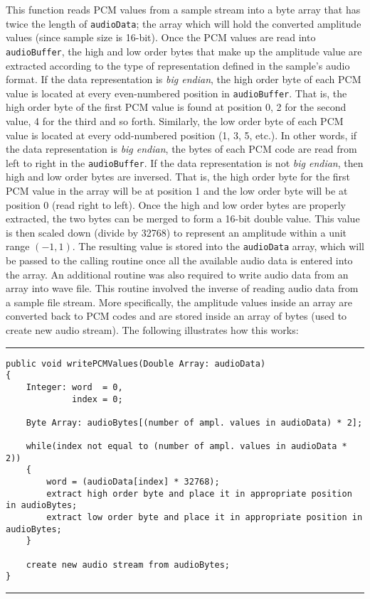 This function reads PCM values from a sample stream into a byte array that has
twice the length of \verb+audioData+; the array which will hold the converted amplitude
values (since sample size is 16-bit). Once the PCM values are read into \verb+audioBuffer+,
the high and low order bytes that make up the amplitude value are extracted
according to the type of representation defined in the sample's audio format.
If the data representation is {\it big endian}, the high order byte of each PCM value is
located at every even-numbered position in \verb+audioBuffer+. That is, the high order
byte of the first PCM value is found at position 0, 2 for the second value, 4 for
the third and so forth. Similarly, the low order byte of each PCM value is located
at every odd-numbered position (1, 3, 5, etc.). In other words, if the data
representation is {\it big endian}, the bytes of each PCM code are read from left to
right in the \verb+audioBuffer+. If the data representation is not {\it big endian}, then high
and low order bytes are inversed. That is, the high order byte for the first PCM
value in the array will be at position 1 and the low order byte will be at
position 0 (read right to left). Once the high and low order bytes are properly
extracted, the two bytes can be merged to form a 16-bit double value. This value is
then scaled down (divide by 32768) to represent an amplitude within a unit range $(-1, 1)$.
The resulting value is stored into the \verb+audioData+ array, which will be passed to
the calling routine once all the available audio data is entered into the array. An
additional routine was also required to write audio data from an array into wave
file. This routine involved the inverse of reading audio data from a sample file
stream. More specifically, the amplitude values inside an array are converted back
to PCM codes and are stored inside an array of bytes (used to create new audio
stream). The following illustrates how this works:

\vspace{15pt}
\hrule
\begin{verbatim}
public void writePCMValues(Double Array: audioData)
{
    Integer: word  = 0,
             index = 0;

    Byte Array: audioBytes[(number of ampl. values in audioData) * 2];

    while(index not equal to (number of ampl. values in audioData * 2))
    {
        word = (audioData[index] * 32768);
        extract high order byte and place it in appropriate position in audioBytes;
        extract low order byte and place it in appropriate position in audioBytes;
    }

    create new audio stream from audioBytes;
}
\end{verbatim}
\hrule
\vspace{15pt}

